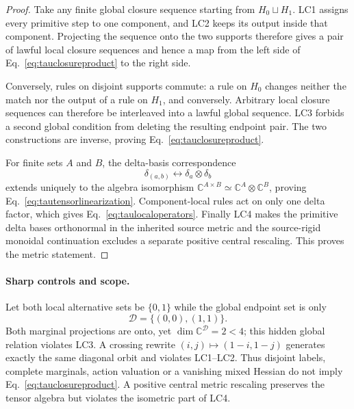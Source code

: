 \begin{proof}
Take any finite global closure sequence starting from $H_0\sqcup H_1$.
LC1 assigns every primitive step to one component, and LC2 keeps its output
inside that component.  Projecting the sequence onto the two supports
therefore gives a pair of lawful local closure sequences and hence a map from
the left side of Eq.~\eqref{eq:tauclosureproduct} to the right side.

Conversely, rules on disjoint supports commute: a rule on $H_0$ changes
neither the match nor the output of a rule on $H_1$, and conversely.
Arbitrary local closure sequences can therefore be interleaved into a lawful
global sequence.  LC3 forbids a second global condition from deleting the
resulting endpoint pair.  The two constructions are inverse, proving
Eq.~\eqref{eq:tauclosureproduct}.

For finite sets $A$ and $B$, the delta-basis correspondence
\begin{equation}
 \delta_{(a,b)}\longleftrightarrow\delta_a\otimes\delta_b
 \label{eq:taudeltatensor}
\end{equation}
extends uniquely to the algebra isomorphism
$\mathbb C^{A\times B}\simeq\mathbb C^A\otimes\mathbb C^B$, proving
Eq.~\eqref{eq:tautensorlinearization}.  Component-local rules act on only one
delta factor, which gives Eq.~\eqref{eq:taulocaloperators}.  Finally LC4 makes
the primitive delta bases orthonormal in the inherited source metric and the
source-rigid monoidal continuation excludes a separate positive central
rescaling.  This proves the metric statement.
\end{proof}

\paragraph{Sharp controls and scope.}
Let both local alternative sets be $\{0,1\}$ while the global endpoint set is
only
\begin{equation}
 \mathcal D=\{(0,0),(1,1)\}.
 \label{eq:tauhiddendiagonal}
\end{equation}
Both marginal projections are onto, yet
$\dim\mathbb C^{\mathcal D}=2<4$; this hidden global relation violates LC3.
A crossing rewrite $(i,j)\mapsto(1-i,1-j)$ generates exactly the same
diagonal orbit and violates LC1--LC2.  Thus disjoint labels, complete
marginals, action valuation or a vanishing mixed Hessian do not imply
Eq.~\eqref{eq:tauclosureproduct}.  A positive central metric rescaling
preserves the tensor algebra but violates the isometric part of LC4.

